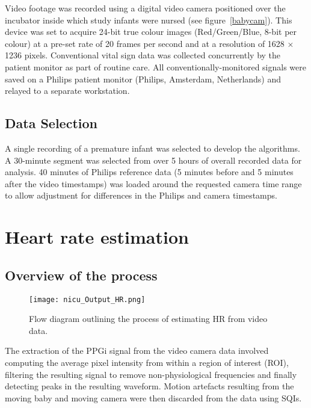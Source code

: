Video footage was recorded using a digital video camera positioned over the incubator inside which study infants were nursed (see figure~\ref{babycam}). This device was set to acquire 24-bit true colour images (Red/Green/Blue, 8-bit per colour) at a pre-set rate of 20 frames per second and at a resolution of 1628 × 1236 pixels. Conventional vital sign data was collected concurrently by the patient monitor as part of routine care. All conventionally-monitored signals were saved on a Philips patient monitor (Philips, Amsterdam, Netherlands)  and relayed to a separate workstation.

\subsection{Data Selection}

A single recording of a premature infant was selected to develop the algorithms. A 30-minute segment was selected from over 5 hours of overall recorded data for analysis. 40 minutes of Philips reference data (5 minutes before and 5 minutes after the video timestamps) was loaded around the requested camera time range to allow adjustment for differences in the Philips and camera timestamps.

\section{Heart rate estimation}

 
\subsection{Overview of the process}

\begin{figure}[!ht]
\centering
\texttt{[image: nicu\_Output\_HR.png]}
    \caption[Flow diagram outlining the process of estimating HR from a video data.]{Flow diagram outlining the process of estimating HR from video data.}
    \label{HRflow}
    \end{figure}
 
The extraction of the PPGi signal from the video camera data involved computing the average pixel intensity from within a region of interest (ROI), filtering the resulting signal to remove non-physiological frequencies and finally detecting peaks in the resulting waveform. 
 Motion artefacts resulting from the moving baby and moving camera were then discarded from the data using SQIs. 
 
